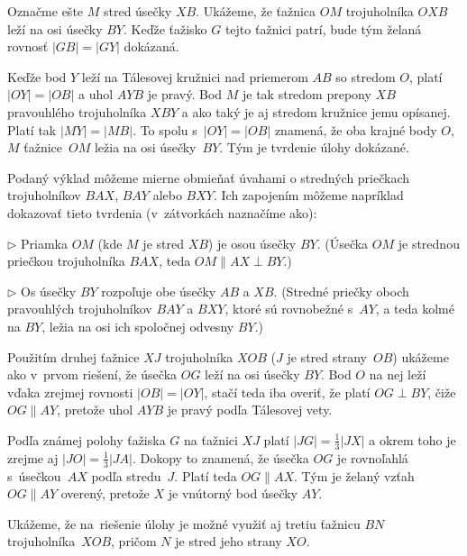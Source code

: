 {%
Označme ešte $M$ stred úsečky $XB$. Ukážeme, že ťažnica $OM$ trojuholníka $OXB$
leží na osi úsečky $BY$. Keďže ťažisko $G$ tejto ťažnici patrí, bude
tým želaná rovnosť $|GB|=|GY|$ dokázaná.

Keďže bod $Y$ leží na Tálesovej kružnici nad priemerom $AB$ so
stredom $O$, platí $|OY| = |OB|$ a uhol $AYB$ je pravý.
Bod $M$ je tak stredom
prepony $XB$ pravouhlého trojuholníka $XBY$ a ako taký je aj stredom kružnice
jemu opísanej. Platí tak ${|MY| = |MB|}$. To spolu s~$|OY| = |OB|$
znamená, že oba krajné body $O$,~$M$ ťažnice~$OM$ ležia na osi úsečky~$BY$. Tým je tvrdenie úlohy dokázané.
%

\poznamka
Podaný výklad môžeme mierne obmieňať úvahami o stredných priečkach
trojuholníkov $BAX$, $BAY$ alebo $BXY$. Ich zapojením môžeme
napríklad dokazovať tieto tvrdenia (v~zátvorkách naznačíme ako):
\item{$\triangleright$} Priamka $OM$ (kde $M$ je stred $XB$) je osou úsečky $BY$. (Úsečka $OM$ je strednou priečkou trojuholníka $BAX$, teda $OM\parallel AX\perp BY$.)
\item{$\triangleright$} Os úsečky $BY$ rozpoľuje obe úsečky $AB$ a $XB$. (Stredné priečky oboch pravouhlých trojuholníkov $BAY$ a $BXY$, ktoré sú rovnobežné s~$AY$, a teda kolmé na $BY$, ležia na osi ich spoločnej odvesny $BY$.)
%

\ineriesenie
Použitím druhej ťažnice $XJ$ trojuholníka $XOB$ ($J$ je stred strany~$OB$)
ukážeme ako v~prvom riešení, že úsečka $OG$ leží na osi úsečky $BY$.
Bod $O$ na nej leží vďaka zrejmej rovnosti $|OB|=|OY|$,
stačí teda iba overiť, že platí $OG\perp BY$, čiže
$OG\parallel AY$, pretože uhol $AYB$ je pravý podľa Tálesovej vety.

Podľa známej polohy ťažiska $G$ na ťažnici $XJ$ platí $|JG|=\frac13|JX|$
a okrem toho je zrejme aj $|JO|=\frac13|JA|$. Dokopy to znamená, že
úsečka $OG$ je rovnoľahlá s~úsečkou~$AX$ podľa stredu~$J$.
Platí teda $OG\parallel AX$. Tým je želaný vzťah
$OG\parallel AY$ overený, pretože $X$ je vnútorný bod úsečky $AY$.
%

\ineriesenie
Ukážeme, že na~riešenie úlohy je možné využiť aj tretiu ťažnicu $BN$
trojuholníka~$XOB$, pričom $N$ je stred jeho strany $XO$.

}
